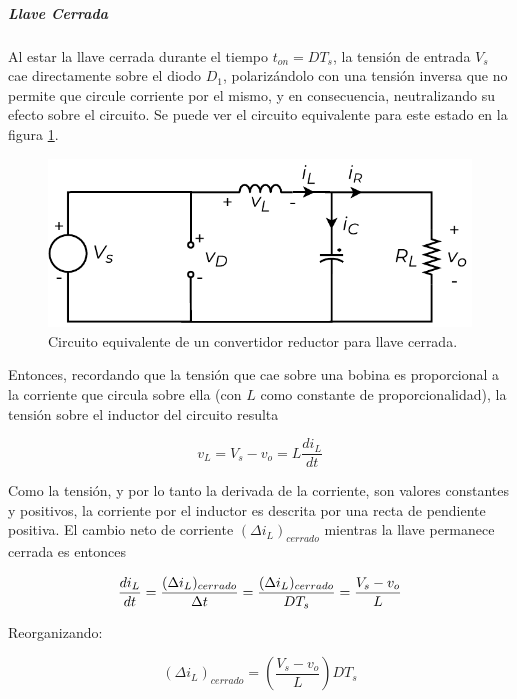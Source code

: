 \subparagraph{Llave Cerrada}

Al estar la llave cerrada durante el tiempo $t_{on} = DT_s$, la tensión de entrada $V_s$ cae directamente sobre el diodo $D_1$, polarizándolo con una tensión inversa que no permite que circule corriente por el mismo, y en consecuencia, neutralizando su efecto sobre el circuito. Se puede ver el circuito equivalente para este estado en la figura \ref{reductor_llave_cerrada}.\\

\begin{figure}[h]
    \centering
    \includegraphics[scale=0.6]{Imagenes/Reductor Llave Cerrada.pdf}
    \caption{Circuito equivalente de un convertidor reductor para llave cerrada.}
    \label{reductor_llave_cerrada}
\end{figure}

Entonces, recordando que la tensión que cae sobre una bobina es proporcional a la corriente que circula sobre ella (con $L$ como constante de proporcionalidad), la tensión sobre el inductor del circuito resulta

\begin{equation}\label{ec_tensionL_cerrada}
    v_L = V_s - v_o = L\frac{di_L}{dt}
\end{equation}

Como la tensión, y por lo tanto la derivada de la corriente, son valores constantes y positivos, la corriente por el inductor es descrita por una recta de pendiente positiva. El cambio neto de corriente $(\Delta i_L)_{cerrado}$ mientras la llave permanece cerrada es entonces

\begin{equation*}
    \frac{di_L}{dt} = \frac{(\Delta i_L)_{cerrado}}{\Delta t} = \frac{(\Delta i_L)_{cerrado}}{DT_s} = \frac{V_s - v_o}{L}\\
\end{equation*}

Reorganizando:

\begin{equation}\label{deltaiL_cerrada}
    \boxed{
        (\Delta i_L)_{cerrado} = \left(\frac{V_s - v_o}{L}\right)DT_s
    }
\end{equation}

